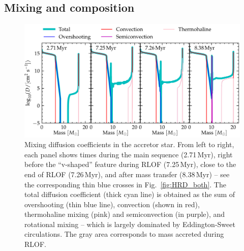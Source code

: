 \documentclass[twocolumn,twocolappendix,trackchanges]{aastex63}
\DeclareRobustCommand{\Figref}[1]{Fig.~\ref{#1}}
\begin{document}
\subsection{Mixing and composition}
\label{sec:mixing}

\begin{figure}[htbp]
  \includegraphics[width=\textwidth]{D_mix}
  \caption{Mixing diffusion coefficients in the accretor star. From
    left to right, each panel shows times during the main sequence
    (2.71\,Myr), right before the ``v-shaped'' feature during RLOF
    (7.25\,Myr), close to the end of RLOF (7.26\,Myr), and after mass
    transfer (8.38\,Myr) -- see the corresponding thin blue crosses in
    \Figref{fig:HRD_both}. The total diffusion coefficient (thick cyan
    line) is obtained as the sum of overshooting (thin blue line),
    convection (shown in red), thermohaline mixing (pink) and
    semiconvection (in purple), and rotational mixing -- which is
    largely dominated by Eddington-Sweet circulations. The gray area corresponds to mass
    accreted during
    RLOF.}
  \label{fig:D_mix}
\end{figure}
\end{document}
